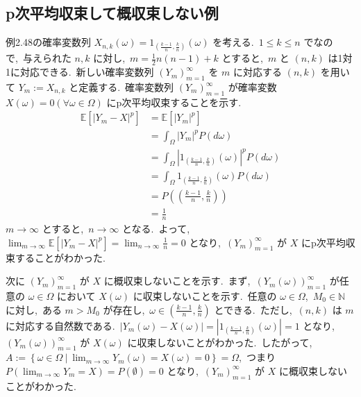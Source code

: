 \documentclass[a4j,11pt]{jarticle}
\theoremstyle{definition}
\begin{document}
\begin{comment}
  (2)十分性

  $\lim_{n\to\infty}F_{X_n} = F_X$
  と仮定する.\ 
  $\pi$-$\lambda$定理より,\ 
  $\lim_{n\to\infty}P_{X_n} = P_X$
  である.\ 
  $A \in \mathcal{B}(\mathbb{R})$
  とする.\ 
  $\lim_{n\to\infty} \int_\mathbb{R} 1_A(x) P_{X_n}(dx) = \lim_{n\to\infty} P_{X_n}(A)$,
  $\int_{\mathbb{R}} 1_A(x) P_X(dx) = P_X(A)$
  より,\ 
  $\lim_{n\to\infty} \int_{\mathbb{R}} 1_A(x) P_{X_n}(dx) = \int_{\mathbb{R}} 1_A(x) P_X(dx)$
  とわかる.\ 
\end{proof}

\end{comment}

\subsection{p次平均収束して概収束しない例}
例2.48の確率変数列
$X_{n,k}(\omega) = 1_{\left( \frac{k-1}{n},\frac{k}{n}\right)}(\omega)$
を考える.\ 
$1\leq k \leq n$
でなので,\ 与えられた
$n,k$
に対し,\ 
$m = \frac{1}{2}n(n-1)+k$
とすると,\ 
$m$
と
$(n,k)$
は1対1に対応できる.\ 
新しい確率変数列
$(Y_m)_{m=1}^{\infty}$
を
$m$
に対応する
$(n,k)$
を用いて
$Y_m:= X_{n,k}$
と定義する.\ 
確率変数列
$(Y_m)_{m=1}^\infty$
が確率変数
$X(\omega) = 0 (\forall \omega \in \Omega)$
にp次平均収束することを示す.\ 
\begin{align}
  \mathbb{E}[|Y_m-X|^p]
  & = \mathbb{E}[|Y_m|^p] \\
  & = \int_{\Omega} |Y_m|^p P(d\omega) \\
  & = \int_{\Omega} |1_{\left( \frac{k-1}{n}, \frac{k}{n}\right)}(\omega)|^p P(d\omega) \\
  & = \int_{\Omega} 1_{\left( \frac{k-1}{n}, \frac{k}{n}\right)}(\omega) P(d\omega)\\
  & = P\left( \left( \frac{k-1}{n}, \frac{k}{n}\right)\right) \\
  & = \frac{1}{n}
\end{align}
$m\to \infty$
とすると,\ 
$n\to \infty$
となる.\ 
よって,\ 
$\lim_{m\to \infty} \mathbb{E}[|Y_m-X|^p] = \lim_{n\to \infty}\frac{1}{n} = 0$
となり,\ 
$(Y_m)_{m=1}^{\infty}$
が
$X$
にp次平均収束することがわかった.\ 

次に
$(Y_m)_{m=1}^{\infty}$
が
$X$
に概収束しないことを示す.\ 
まず,\ 
$(Y_m(\omega))_{m=1}^{\infty}$
が任意の
$\omega \in \Omega$
において
$X(\omega)$
に収束しないことを示す.\ 
任意の
$\omega \in \Omega$,\ 
$M_0 \in \mathbb{N}$
に対し,\ ある
$m > M_0$
が存在し,\ 
$\omega \in \left( \frac{k-1}{n}, \frac{k}{n}\right)$
とできる.\ 
ただし,\ 
$(n,k)$
は
$m$
に対応する自然数である.\ 
$|Y_m(\omega) - X(\omega)| = |1_{\left( \frac{k-1}{n}, \frac{k}{n}\right)}(\omega)| = 1$
となり,\ 
$(Y_m(\omega))_{m=1}^{\infty}$
が
$X(\omega)$
に収束しないことがわかった.\ 
したがって,\ 
$A:= \left\{\omega \in \Omega \ | \ \lim_{m\to \infty}Y_m(\omega) = X(\omega) = 0 \right\} = \Omega$,\ 
つまり
$P(\lim_{m\to\infty}Y_m = X) = P(\emptyset) = 0$
となり,\ 
$(Y_m)_{m=1}^{\infty}$
が
$X$
に概収束しないことがわかった.\ 
\end{document}
